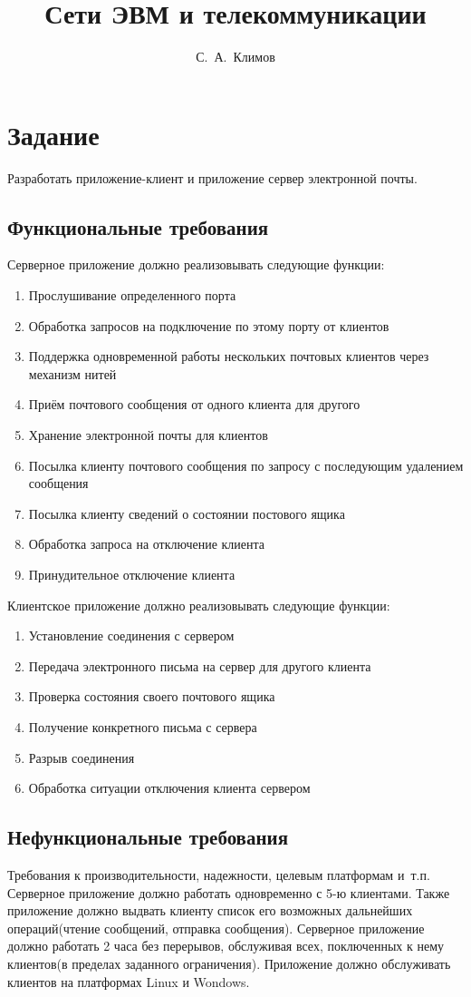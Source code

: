 \documentclass[12pt,a4paper]{report}
\author{С.~А.~Климов}
\title{Сети ЭВМ и телекоммуникации}
\begin{document}
\maketitle
\chapter{Задание}
Разработать приложение-клиент и приложение сервер электронной почты.
\section{Функциональные требования}
Серверное приложение должно реализовывать следующие функции:
\begin{enumerate}
\item Прослушивание определенного порта
\item Обработка запросов на подключение по этому порту от клиентов
\item Поддержка одновременной работы нескольких почтовых клиентов
через механизм нитей
\item Приём почтового сообщения от одного клиента для другого
\item Хранение электронной почты для клиентов
\item Посылка клиенту почтового сообщения по запросу с последующим
удалением сообщения
\item Посылка клиенту сведений о состоянии постового ящика
\item Обработка запроса на отключение клиента
\item Принудительное отключение клиента
\end{enumerate}
Клиентское приложение должно реализовывать следующие функции:
\begin{enumerate}
\item Установление соединения с сервером
\item Передача электронного письма на сервер для другого клиента
\item Проверка состояния своего почтового ящика
\item Получение конкретного письма с сервера
\item Разрыв соединения
\item Обработка ситуации отключения клиента сервером
\end{enumerate}
\section{Нефункциональные требования}
Требования к производительности, надежности, целевым платформам и~т.п.
Серверное приложение должно работать одновременно с 5-ю клиентами. Также приложение должно выдвать клиенту список его возможных дальнейших операций(чтение сообщений, отправка сообщения). Серверное приложение должно работать 2 часа без перерывов, обслуживая всех, поключенных к нему клиентов(в пределах заданного ограничения). Приложение должно обслуживать клиентов на платформах Linux и Wondows.
\end{document}
